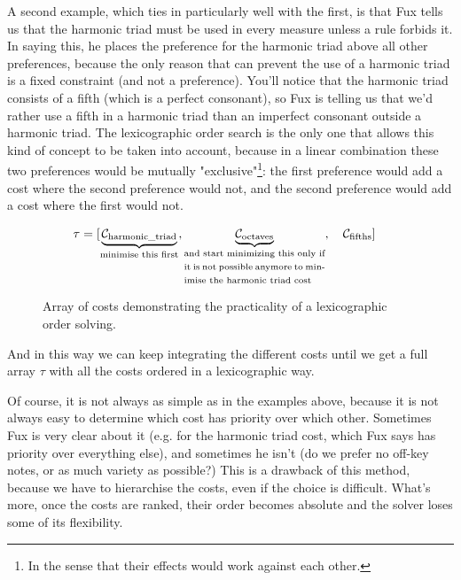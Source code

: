 A second example, which ties in particularly well with the first, is that Fux tells us that the harmonic triad must be used in every measure unless a rule forbids it. In saying this, he places the preference for the harmonic triad above all other preferences, because the only reason that can prevent the use of a harmonic triad is a fixed constraint (and not a preference). You'll notice that the harmonic triad consists of a fifth (which is a perfect consonant), so Fux is telling us that we'd rather use a fifth in a harmonic triad than an imperfect consonant outside a harmonic triad. The lexicographic order search is the only one that allows this kind of concept to be taken into account, because in a linear combination these two preferences would be mutually "exclusive"\footnote{In the sense that their effects would work against each other.}: the first preference would add a cost where the second preference would not, and the second preference would add a cost where the first would not.

\begin{figure}[h]
    \begin{equation}
        \begin{aligned}
            \tau = [& \underset{\text{\fontsize{7}{11}\selectfont{minimise this first}}}{\underbrace{\mathcal{C}_\text{harmonic\_triad}}}, \underset{\text{\fontsize{7}{11}\selectfont\parbox{4cm}{and start minimizing this only if it is not possible anymore to minimise the harmonic triad cost}}}{\underbrace{\mathcal{C}_\text{octaves}}},\quad  \mathcal{C}_\text{fifths}]
        \end{aligned}
    \end{equation}
    \caption{Array of costs demonstrating the practicality of a lexicographic order solving.}
\end{figure}

And in this way we can keep integrating the different costs until we get a full array $\tau$ with all the costs ordered in a lexicographic way.


Of course, it is not always as simple as in the examples above, because it is not always easy to determine which cost has priority over which other. Sometimes Fux is very clear about it (e.g. for the harmonic triad cost, which Fux says has priority over everything else), and sometimes he isn't (do we prefer no off-key notes, or as much variety as possible?) This is a drawback of this method, because we have to hierarchise the costs, even if the choice is difficult. What's more, once the costs are ranked, their order becomes absolute and the solver loses some of its flexibility.


